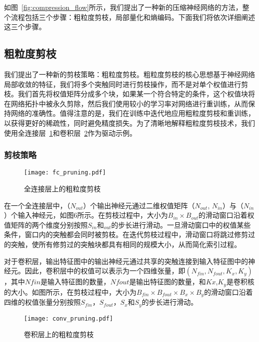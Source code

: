 如图~\ref{fig:compression_flow}所示，我们提出了一种新的压缩神经网络的方法，整个流程包括三个步骤：粗粒度剪枝，局部量化和熵编码。下面我们将依次详细阐述这三个步骤。


\subsection{粗粒度剪枝}

我们提出了一种新的剪枝策略：粗粒度剪枝。粗粒度剪枝的核心思想基于神经网络局部收敛的特征，我们将多个突触同时进行剪枝操作，而不是对单个权值进行剪枝。我们首先将权值矩阵分成多个块，如果某一个符合特定的条件，这个权值块将在网络拓扑中被永久剪除，然后我们使用较小的学习率对网络进行重训练，从而保持网络的准确性。值得注意的是，我们在训练中迭代地应用粗粒度剪枝和重训练，以获得更好的稀疏性，同时避免精度损失。为了清晰地解释粗粒度剪枝技术，我们使用全连接层~\ref{fig:fc_pruning}和卷积层~\ref{fig:conv_pruning}作为驱动示例。

\subsubsection{剪枝策略}

\begin{figure}[h]
\centering
\texttt{[image: fc\_pruning.pdf]}
\caption{全连接层上的粗粒度剪枝}
\label{fig:fc_pruning}
\end{figure}

在一个全连接层中，（$N_{out}$）个输出神经元通过二维权值矩阵（$N_{out}$, $N_{in}$）与（$N_{in}$）个输入神经元，如图6所示。在剪枝过程中，大小为$B_{in} \times B_{out}$的滑动窗口沿着权值矩阵的两个维度分别按照$S_{in}$和$_{out}$的步长进行滑动。一旦滑动窗口中的权值某些条件，窗口内的突触都会同时被剪枝。在迭代剪枝过程中，滑动窗口将跳过修剪过的突触，使所有修剪过的突触块都具有相同的规模大小，从而简化索引过程。

对于卷积层，输出特征图中的输出神经元通过共享的突触连接到输入特征图中的神经元。因此，卷积层中的权值可以表示为一个四维张量，即$(N_{fin},N_{fout},K_x,K_y)$，其中$N {fin}$是输入特征图的数量，$N {fout}$是输出特征图的数量，和$K x$,$K_y$是卷积核的大小。如图所示，在剪枝过程中，大小为$B_{fin} \times B_{fout} \times B_x \times B_y$的滑动窗口沿着四维的权值张量分别按照$S_{fin}$，$S_{fout}$，$S_x$和$S_y$的步长进行滑动。

\begin{figure}[h]
  \centering
  \texttt{[image: conv\_pruning.pdf]}
  \caption{卷积层上的粗粒度剪枝}
  \label{fig:conv_pruning}
\end{figure}

